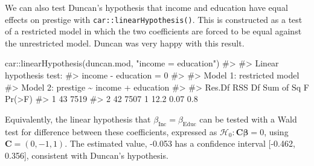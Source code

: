 \documentclass[
  letterpaper,
  10pt,
  krantz2]{krantz}
\makeatletter
\newenvironment{Shaded}{\begin{snugshade}}{\end{snugshade}}
\newcommand{\CommentTok}[1]{\textcolor[rgb]{0.37,0.37,0.37}{#1}}
\newcommand{\DecValTok}[1]{\textcolor[rgb]{0.68,0.00,0.00}{#1}}
\newcommand{\FunctionTok}[1]{\textcolor[rgb]{0.28,0.35,0.67}{#1}}
\newcommand{\NormalTok}[1]{\textcolor[rgb]{0.00,0.23,0.31}{#1}}
\newcommand{\OtherTok}[1]{\textcolor[rgb]{0.00,0.23,0.31}{#1}}
\newcommand{\SpecialCharTok}[1]{\textcolor[rgb]{0.37,0.37,0.37}{#1}}
\newcommand{\StringTok}[1]{\textcolor[rgb]{0.13,0.47,0.30}{#1}}
\newenvironment{kframe}{%
  \medskip{}
  \setlength{\fboxsep}{.8em}
  \def\at@end@of@kframe{}%
  \ifinner\ifhmode%
  \def\at@end@of@kframe{\end{minipage}}%
  \begin{minipage}{\columnwidth}%
  \fi\fi%
  \def\FrameCommand##1{\hskip\@totalleftmargin \hskip-\fboxsep
  \colorbox{shadecolor}{##1}\hskip-\fboxsep
      \hskip-\linewidth \hskip-\@totalleftmargin \hskip\columnwidth}%
  \MakeFramed {\advance\hsize-\width
    \@totalleftmargin\z@ \linewidth\hsize
    \@setminipage}}%
{\par\unskip\endMakeFramed%
  \at@end@of@kframe}
\renewenvironment{Shaded}{\begin{kframe}}{\end{kframe}}
\makeatother
\begin{document}
We can also test Duncan's hypothesis that income and education have
equal effects on prestige with \texttt{car::linearHypothesis()}. This is
constructed as a test of a restricted model in which the two
coefficients are forced to be equal against the unrestricted model.
Duncan was very happy with this result.

\begin{Shaded}
\begin{Highlighting}[]
\NormalTok{car}\SpecialCharTok{::}\FunctionTok{linearHypothesis}\NormalTok{(duncan.mod, }\StringTok{"income = education"}\NormalTok{)}
\CommentTok{\#\textgreater{} }
\CommentTok{\#\textgreater{} Linear hypothesis test:}
\CommentTok{\#\textgreater{} income {-} education = 0}
\CommentTok{\#\textgreater{} }
\CommentTok{\#\textgreater{} Model 1: restricted model}
\CommentTok{\#\textgreater{} Model 2: prestige \textasciitilde{} income + education}
\CommentTok{\#\textgreater{} }
\CommentTok{\#\textgreater{}   Res.Df  RSS Df Sum of Sq    F Pr(\textgreater{}F)}
\CommentTok{\#\textgreater{} 1     43 7519                         }
\CommentTok{\#\textgreater{} 2     42 7507  1      12.2 0.07    0.8}
\end{Highlighting}
\end{Shaded}

Equivalently, the linear hypothesis that
\(\beta_{\text{Inc}} = \beta_{\text{Educ}}\) can be tested with a Wald
test for difference between these coefficients, expressed as
\(\mathcal{H}_0 : \mathbf{C} \mathbf{\beta} = 0\), using
\(\mathbf{C} = (0, -1, 1)\). The estimated value, -0.053 has a
confidence interval {[}-0.462, 0.356{]}, consistent with Duncan's
hypothesis.

\begin{Shaded}
\end{Shaded}
\end{document}
